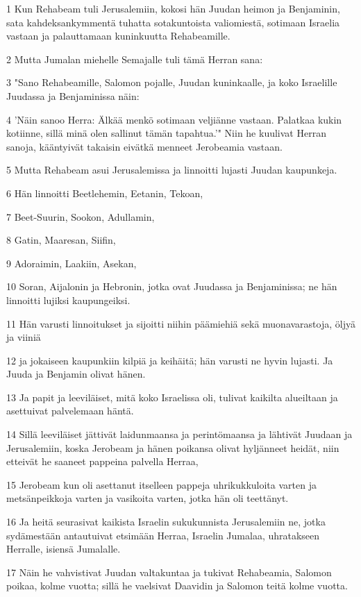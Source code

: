 \par 1 Kun Rehabeam tuli Jerusalemiin, kokosi hän Juudan heimon ja Benjaminin, sata kahdeksankymmentä tuhatta sotakuntoista valiomiestä, sotimaan Israelia vastaan ja palauttamaan kuninkuutta Rehabeamille.
\par 2 Mutta Jumalan miehelle Semajalle tuli tämä Herran sana:
\par 3 "Sano Rehabeamille, Salomon pojalle, Juudan kuninkaalle, ja koko Israelille Juudassa ja Benjaminissa näin:
\par 4 'Näin sanoo Herra: Älkää menkö sotimaan veljiänne vastaan. Palatkaa kukin kotiinne, sillä minä olen sallinut tämän tapahtua.'" Niin he kuulivat Herran sanoja, kääntyivät takaisin eivätkä menneet Jerobeamia vastaan.
\par 5 Mutta Rehabeam asui Jerusalemissa ja linnoitti lujasti Juudan kaupunkeja.
\par 6 Hän linnoitti Beetlehemin, Eetanin, Tekoan,
\par 7 Beet-Suurin, Sookon, Adullamin,
\par 8 Gatin, Maaresan, Siifin,
\par 9 Adoraimin, Laakiin, Asekan,
\par 10 Soran, Aijalonin ja Hebronin, jotka ovat Juudassa ja Benjaminissa; ne hän linnoitti lujiksi kaupungeiksi.
\par 11 Hän varusti linnoitukset ja sijoitti niihin päämiehiä sekä muonavarastoja, öljyä ja viiniä
\par 12 ja jokaiseen kaupunkiin kilpiä ja keihäitä; hän varusti ne hyvin lujasti. Ja Juuda ja Benjamin olivat hänen.
\par 13 Ja papit ja leeviläiset, mitä koko Israelissa oli, tulivat kaikilta alueiltaan ja asettuivat palvelemaan häntä.
\par 14 Sillä leeviläiset jättivät laidunmaansa ja perintömaansa ja lähtivät Juudaan ja Jerusalemiin, koska Jerobeam ja hänen poikansa olivat hyljänneet heidät, niin etteivät he saaneet pappeina palvella Herraa,
\par 15 Jerobeam kun oli asettanut itselleen pappeja uhrikukkuloita varten ja metsänpeikkoja varten ja vasikoita varten, jotka hän oli teettänyt.
\par 16 Ja heitä seurasivat kaikista Israelin sukukunnista Jerusalemiin ne, jotka sydämestään antautuivat etsimään Herraa, Israelin Jumalaa, uhratakseen Herralle, isiensä Jumalalle.
\par 17 Näin he vahvistivat Juudan valtakuntaa ja tukivat Rehabeamia, Salomon poikaa, kolme vuotta; sillä he vaelsivat Daavidin ja Salomon teitä kolme vuotta.
